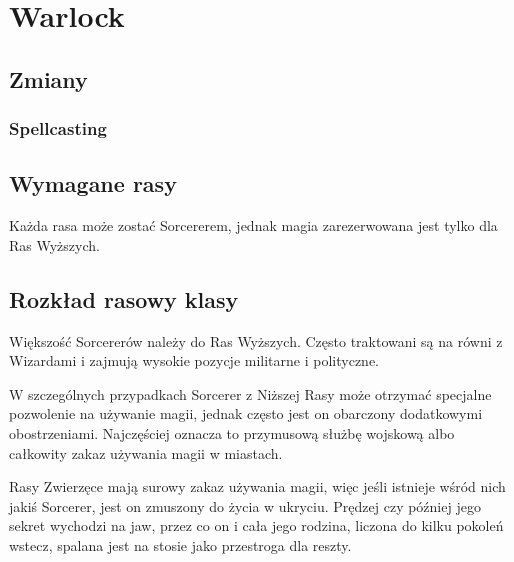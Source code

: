 \section{Warlock}
\subsection{Zmiany}
\subsubsection{Spellcasting}

\subsection{Wymagane rasy}
Każda rasa może zostać Sorcererem, jednak magia zarezerwowana jest tylko dla Ras
Wyższych.

\subsection{Rozkład rasowy klasy}
Większość Sorcererów należy do Ras Wyższych.  Często traktowani są	na	równi  z
Wizardami	 i	  zajmują	 wysokie	pozycje    militarne	i	 polityczne.

W	szczególnych   przypadkach	 Sorcerer	z	Niższej   Rasy	 może	otrzymać
specjalne  pozwolenie  na  używanie  magii,  jednak  często  jest  on  obarczony
dodatkowymi obostrzeniami.	Najczęściej oznacza to	przymusową	służbę	wojskową
albo całkowity zakaz używania magii w miastach.

Rasy Zwierzęce mają surowy zakaz używania magii, więc jeśli istnieje wśród	nich
jakiś Sorcerer, jest on zmuszony do życia w ukryciu.  Prędzej czy  później	jego
sekret wychodzi na jaw, przez co on  i	cała  jego	rodzina,  liczona  do  kilku
pokoleń  wstecz,  spalana  jest  na   stosie   jako   przestroga   dla	 reszty.

